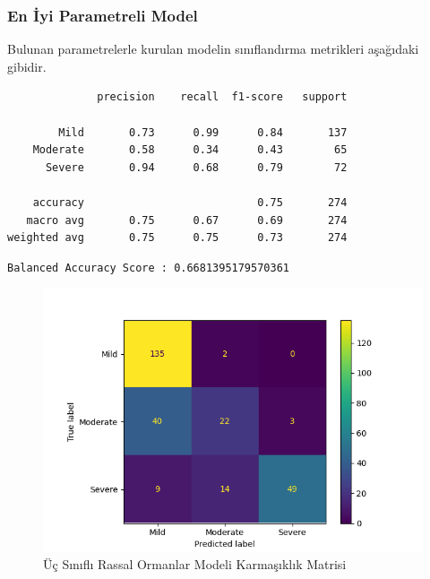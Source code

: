 \documentclass[12pt,twoside]{deuthesis}
\begin{document}
\hypertarget{en-iyi-parametreli-model-1}{%
\subsubsection{En İyi Parametreli Model}\label{en-iyi-parametreli-model-1}}

Bulunan parametrelerle kurulan modelin sınıflandırma metrikleri aşağıdaki gibidir.
\begin{verbatim}
              precision    recall  f1-score   support

        Mild       0.73      0.99      0.84       137
    Moderate       0.58      0.34      0.43        65
      Severe       0.94      0.68      0.79        72

    accuracy                           0.75       274
   macro avg       0.75      0.67      0.69       274
weighted avg       0.75      0.75      0.73       274
\end{verbatim}
\begin{verbatim}
Balanced Accuracy Score : 0.6681395179570361
\end{verbatim}
\begin{figure}

{\centering \includegraphics[width=1.05\linewidth,height=0.6\textheight]{figure/rfc_conf} 

}

\caption{Üç Sınıflı Rassal Ormanlar Modeli Karmaşıklık Matrisi}\label{fig:unnamed-chunk-34}
\end{figure}
\end{document}
